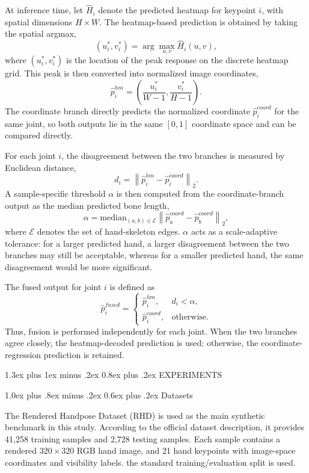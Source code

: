 \documentclass[10pt,letterpaper]{article}
\makeatletter
\renewcommand\section{\@startsection{section}{1}{\z@}%
  {1.3ex plus 1ex minus .2ex}%
  {0.8ex plus .2ex}%
  {\centering\normalfont\small\scshape}}
\renewcommand\subsection{\@startsection{subsection}{2}{\z@}%
  {1.0ex plus .8ex minus .2ex}%
  {0.6ex plus .2ex}%
  {\normalfont\itshape}}
\makeatother
\begin{document}
At inference time, let \(\hat{H}_i\) denote the predicted heatmap for keypoint \(i\), with spatial dimensions \(H \times W\). The heatmap-based prediction is obtained by taking the spatial argmax,
\[
(u_i^*, v_i^*) = \arg\max_{u,v} \hat{H}_i(u,v),
\]
where \((u_i^*, v_i^*)\) is the location of the peak response on the discrete heatmap grid. This peak is then converted into normalized image coordinates,
\[
\hat{p}^{hm}_i =
\left(
\frac{u_i^*}{W-1},
\frac{v_i^*}{H-1}
\right).
\]
The coordinate branch directly predicts the normalized coordinate \(\hat{p}^{coord}_i\) for the same joint, so both outputs lie in the same \([0,1]\) coordinate space and can be compared directly.

For each joint \(i\), the disagreement between the two branches is measured by Euclidean distance,
\[
d_i = \left\| \hat{p}^{hm}_i - \hat{p}^{coord}_i \right\|_2.
\]
A sample-specific threshold \(\alpha\) is then computed from the coordinate-branch output as the median predicted bone length,
\[
\alpha = \mathrm{median}_{(a,b)\in \mathcal{E}}
\left\| \hat{p}^{coord}_a - \hat{p}^{coord}_b \right\|_2,
\]
where \(\mathcal{E}\) denotes the set of hand-skeleton edges. \(\alpha\) acts as a scale-adaptive tolerance: for a larger predicted hand, a larger disagreement between the two branches may still be acceptable, whereas for a smaller predicted hand, the same disagreement would be more significant.

The fused output for joint \(i\) is defined as
\[
\hat{p}^{fused}_i =
\begin{cases}
\hat{p}^{hm}_i, & d_i < \alpha, \\
\hat{p}^{coord}_i, & \text{otherwise.}
\end{cases}
\]
Thus, fusion is performed independently for each joint. When the two branches agree closely, the heatmap-decoded prediction is used; otherwise, the coordinate-regression prediction is retained.

\section{EXPERIMENTS}

\subsection{Datasets}

The Rendered Handpose Dataset (RHD) is used as the main synthetic benchmark in this study. According to the official dataset description, it provides 41,258 training samples and 2,728 testing samples. Each sample contains a rendered $320 \times 320$ RGB hand image, and 21 hand keypoints with image-space coordinates and visibility labels. the standard training/evaluation split is used.
\end{document}
